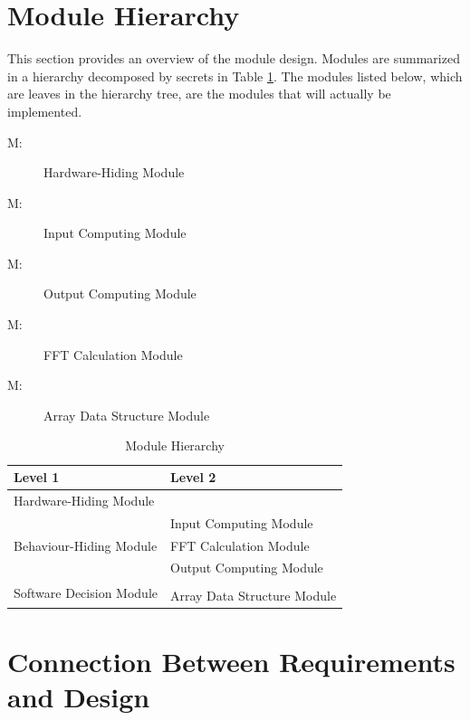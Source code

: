 \documentclass[12pt, titlepage]{article}
\newcounter{mnum}
\newcommand{\mthemnum}{M\themnum}
\begin{document}
\section{Module Hierarchy} \label{SecMH}

This section provides an overview of the module design. Modules are summarized
in a hierarchy decomposed by secrets in Table \ref{TblMH}. The modules listed
below, which are leaves in the hierarchy tree, are the modules that will
actually be implemented.

\begin{description}

\item [ \mthemnum \label{mHH}:] Hardware-Hiding Module
\item [ \mthemnum \label{mInput}:] Input Computing Module
\item [ \mthemnum \label{mOutput}:] Output  Computing Module
\item [ \mthemnum \label{FFTcal}:] FFT Calculation Module
\item [ \mthemnum \label{mSeqDS}:] Array Data Structure Module
\end{description}


\begin{table}[h!]
\centering
\begin{tabular}{p{} p{}}
\toprule
\textbf{Level 1} & \textbf{Level 2}\\
\midrule

{Hardware-Hiding Module} & ~ \\
\midrule

\multirow{3}{0.3\textwidth}{Behaviour-Hiding Module}
& Input Computing Module\\
& FFT Calculation Module\\
& Output Computing Module\\
\midrule

\multirow{3}{0.3\textwidth}{Software Decision Module}\\
& Array Data Structure Module\\
\bottomrule

\end{tabular}
\caption{Module Hierarchy}
\label{TblMH}
\end{table}

\section{Connection Between Requirements and Design} \label{SecConnection}
\end{document}
